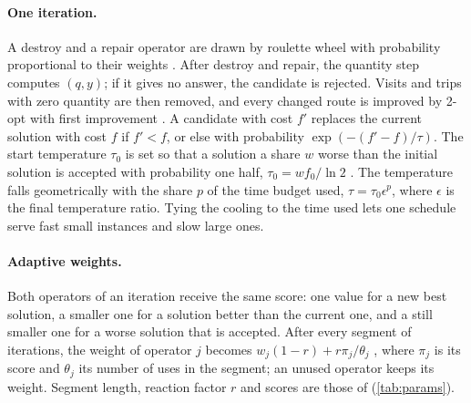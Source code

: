 \documentclass[11pt,a4paper]{article}
\begin{document}
\paragraph{One iteration.}
A destroy and a repair operator are drawn by roulette wheel with probability proportional to their
weights \citep{ropke2006adaptive}. After destroy and repair, the quantity step computes $(q, y)$;
if it gives no answer, the candidate is rejected. Visits and trips with zero quantity are then
removed, and every changed route is improved by 2-opt with first improvement
\citep{croes1958method}. A candidate with cost $f'$ replaces the current solution with cost $f$ if
$f' < f$, or else with probability $\exp(-(f' - f)/\tau)$. The start temperature $\tau_0$ is set so
that a solution a share $w$ worse than the initial solution is accepted with probability one half,
$\tau_0 = w f_0 / \ln 2$ \citep{ropke2006adaptive}. The temperature falls geometrically with the
share $p$ of the time budget used, $\tau = \tau_0 \epsilon^{p}$, where $\epsilon$ is the final
temperature ratio. Tying the cooling to the time used lets one schedule serve fast small
instances and slow large ones.

\paragraph{Adaptive weights.}
Both operators of an iteration receive the same score: one value for a new best solution, a
smaller one for a solution better than the current one, and a still smaller one for a worse
solution that is accepted. After every segment of iterations, the weight of operator $j$ becomes
$w_j (1 - r) + r \pi_j / \theta_j$ \citep{ropke2006adaptive}, where $\pi_j$ is its score and
$\theta_j$ its number of uses in the segment; an unused operator keeps its weight. Segment length,
reaction factor $r$ and scores are those of \citet{coelho2012transshipment} (\cref{tab:params}).
\end{document}
